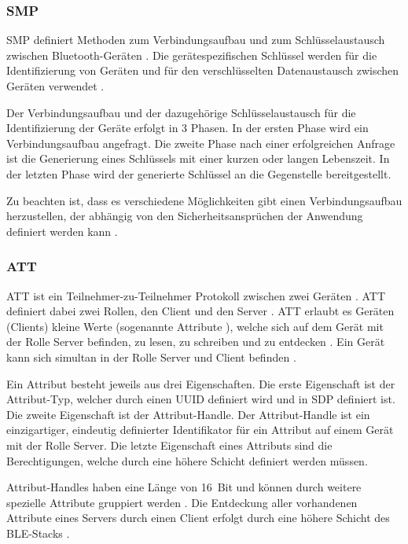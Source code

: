 \subsubsection{\acf{SMP}}
\ac{SMP} definiert Methoden zum Verbindungsaufbau und zum Schlüsselaustausch zwischen Bluetooth-Geräten \cite[S.~1554]{bluetoothCore}. Die gerätespezifischen Schlüssel werden für die Identifizierung von Geräten und für den verschlüsselten Datenaustausch zwischen Geräten verwendet \cites[S.~1556]{bluetoothCore}[S.~18]{siliconBLE}.

Der Verbindungsaufbau und der dazugehörige Schlüsselaustausch für die Identifizierung der Geräte erfolgt in 3 Phasen. In der ersten Phase wird ein Verbindungsaufbau angefragt. Die zweite Phase nach einer erfolgreichen Anfrage ist die Generierung eines Schlüssels mit einer kurzen oder langen Lebenszeit. In der letzten Phase wird der generierte Schlüssel an die Gegenstelle bereitgestellt. \cite[S.~1556]{bluetoothCore}

Zu beachten ist, dass es verschiedene Möglichkeiten gibt einen Verbindungsaufbau herzustellen, der abhängig von den Sicherheitsansprüchen der Anwendung definiert werden kann \cite[S.~18]{siliconBLE}.

\subsubsection{\acf{ATT}}
\ac{ATT} ist ein Teilnehmer-zu-Teilnehmer Protokoll zwischen zwei Geräten \cite[S.~206]{bluetoothCore}. \ac{ATT} definiert dabei zwei Rollen, den Client und den Server \cite[S.~1410]{bluetoothCore}. \ac{ATT} erlaubt es Geräten (Clients) kleine Werte (sogenannte Attribute \cite[S.~279]{bluetoothCore}), welche sich auf dem Gerät mit der Rolle Server befinden, zu lesen, zu schreiben und zu entdecken \cite[S.~1409]{bluetoothCore}. Ein Gerät kann sich simultan in der Rolle Server und Client befinden \cite[S.~279]{bluetoothCore}.

Ein Attribut besteht jeweils aus drei Eigenschaften. Die erste Eigenschaft ist der Attribut-Typ, welcher durch einen \acf{UUID} definiert wird und in \ac{SDP} definiert ist. Die zweite Eigenschaft ist der Attribut-Handle. Der Attribut-Handle ist ein einzigartiger, eindeutig definierter Identifikator für ein Attribut auf einem Gerät mit der Rolle Server. Die letzte Eigenschaft eines Attributs sind die Berechtigungen, welche durch eine höhere Schicht definiert werden müssen. \cite[S.~1410ff.]{bluetoothCore}

Attribut-Handles haben eine Länge von 16~Bit und können durch weitere spezielle Attribute gruppiert werden \cite[S.~1412f.]{bluetoothCore}. Die Entdeckung aller vorhandenen Attribute eines Servers durch einen Client erfolgt durch eine höhere Schicht des \ac{BLE}-Stacks \cite[S.~1410]{bluetoothCore}.

